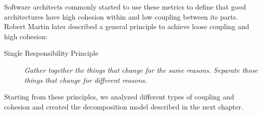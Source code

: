 Software architects commonly started to use these metrics to define that good architectures have high cohesion within and low coupling between its parts. Robert Martin later described a general principle to achieve loose coupling and high cohesion:

\begin{description}
	\item[Single Responsibility Principle] \textit{Gather together the things that change for the same reasons. Separate those things that change for different reasons.}\cite{SRP}
\end{description}

Starting from these principles, we analyzed different types of coupling and cohesion and created the decomposition model described in the next chapter.

